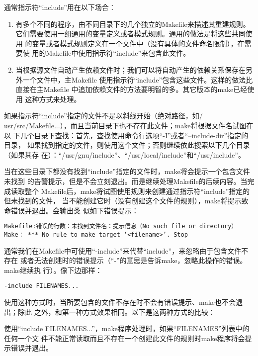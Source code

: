 通常指示符“include”用在以下场合：

\begin{enumerate}
\itemsep=0pt \parskip=0pt
\item 有多个不同的程序，由不同目录下的几个独立的Makefile来描述其重建规则。
    它们需要使用一组通用的变量定义或者模式规则。通用的做法是将这些共同使用
    的变量或者模式规则定义在一个文件中（没有具体的文件命名限制），在需要使
    用的Makefile中使用指示符“include”来包含此文件。
\item 当根据源文件自动产生依赖文件时；我们可以将自动产生的依赖关系保存在另
    外一个文件中，主Makefile 使用指示符“include”包含这些文件。这样的做法比
    直接在主Makefile 中追加依赖文件的方法要明智的多。其它版本的make已经使用
    这种方式来处理。
\end{enumerate}

如果指示符“include”指定的文件不是以斜线开始（绝对路径，如/
usr/src/Makefile...），而且当前目录下也不存在此文件；make将根据文件名试图在以
下几个目录下查找：首先，查找使用命令行选项“-I”或者“--include-dir”指定的目录，
如果找到指定的文件，则使用这个文件；否则继续依此搜索以下几个目录（如果其存
在）：“/usr/gnu/include”、“/usr/local/include”和“/usr/include”。

当在这些目录下都没有找到“include”指定的文件时，make将会提示一个包含文件未找到
的告警提示，但是不会立刻退出。而是继续处理Makefile的后续内容。当完成读取整个
Makefile后，make将试图使用规则来创建通过指示符“include”指定的但未找到的文件，
当不能创建它时（没有创建这个文件的规则），make将提示致命错误并退出。会输出类
似如下错误提示：

\begin{Verbatim}[]
Makefile:错误的行数：未找到文件名：提示信息（No such file or directory）
Make： *** No rule to make target ‘<filename>’. Stop
\end{Verbatim}

通常我们在Makefile中可使用“-include”来代替“include”，来忽略由于包含文件不存在
或者无法创建时的错误提示（“-”的意思是告诉make，忽略此操作的错误。make继续执
行）。像下边那样：
\begin{Verbatim}[]
-include FILENAMES...
\end{Verbatim}

使用这种方式时，当所要包含的文件不存在时不会有错误提示、make也不会退出；除此
之外，和第一种方式效果相同。以下是这两种方式的比较：

使用“include FILENAMES...”，make程序处理时，如果“FILENAMES”列表中的任何一个文
件不能正常读取而且不存在一个创建此文件的规则时make程序将会提示错误并退出。

